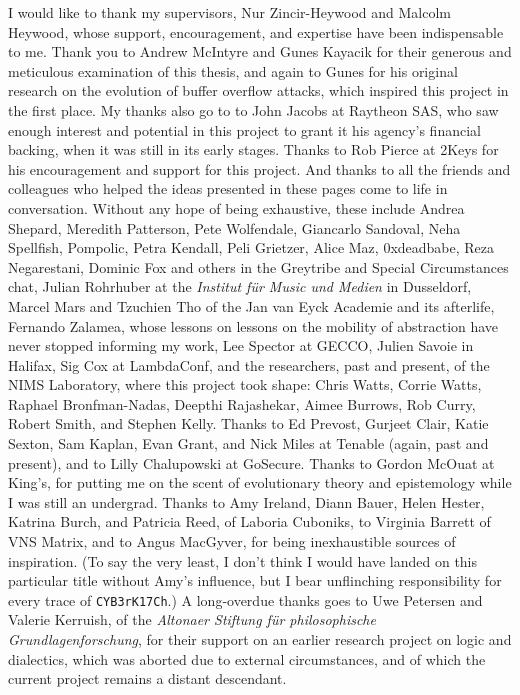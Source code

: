 \printnoidxglossaries
\clearpage
{}

\begin{acknowledgements}
I would like to thank my supervisors, Nur Zincir-Heywood and Malcolm Heywood,
whose support, encouragement, and expertise have been indispensable to me. Thank
you to Andrew McIntyre and Gunes Kayacik for their generous and meticulous
examination of this thesis, and again to Gunes for his original research on the
evolution of buffer overflow attacks, which inspired this project in the first
place. My thanks also go to to John Jacobs at Raytheon SAS, who saw enough
interest and potential in this project to grant it his agency's financial
backing, when it was still in its early stages. Thanks to Rob Pierce at 2Keys
for his encouragement and support for this project. And thanks to all the
friends and colleagues who helped the ideas presented in these pages come to
life in conversation. Without any hope of being exhaustive, these include Andrea
Shepard, Meredith Patterson, Pete Wolfendale, Giancarlo Sandoval, Neha
Spellfish, Pompolic, Petra Kendall, Peli Grietzer, Alice Maz, 0xdeadbabe, Reza
Negarestani, Dominic Fox and others in the Greytribe and Special Circumstances
chat, Julian Rohrhuber at the \emph{Institut f\"ur Music und Medien} in
Dusseldorf, Marcel Mars and Tzuchien Tho of the Jan van Eyck Academie and its
afterlife, Fernando Zalamea, whose lessons on lessons on the mobility of
abstraction have never stopped informing my work, Lee Spector at GECCO, Julien
Savoie in Halifax, Sig Cox at LambdaConf, and the researchers, past and present,
of the NIMS Laboratory, where this project took shape: Chris Watts, Corrie
Watts, Raphael Bronfman-Nadas, Deepthi Rajashekar, Aimee Burrows, Rob Curry,
Robert Smith, and Stephen Kelly. Thanks to Ed Prevost, Gurjeet Clair, Katie
Sexton, Sam Kaplan, Evan Grant, and Nick Miles at Tenable (again, past and
present), and to Lilly Chalupowski at GoSecure. Thanks to Gordon McOuat at
King's, for putting me on the scent of evolutionary theory and epistemology
while I was still an undergrad. Thanks to Amy Ireland, Diann Bauer, Helen Hester,
Katrina Burch, and Patricia Reed, of Laboria Cuboniks, to Virginia Barrett of
VNS Matrix, and to Angus MacGyver, for being inexhaustible sources of
inspiration. (To say the very least, I don't think I would have landed on this
particular title without Amy's influence, but I bear unflinching responsibility
for every trace of \texttt{CYB3rK17Ch}.) A long-overdue thanks goes to Uwe
Petersen and Valerie Kerruish, of the \emph{Altonaer Stiftung für philosophische
Grundlagenforschung}, for their support on an earlier research project on logic
and dialectics, which was aborted due to external circumstances, and of which
the current project remains a distant descendant.


\end{acknowledgements}

